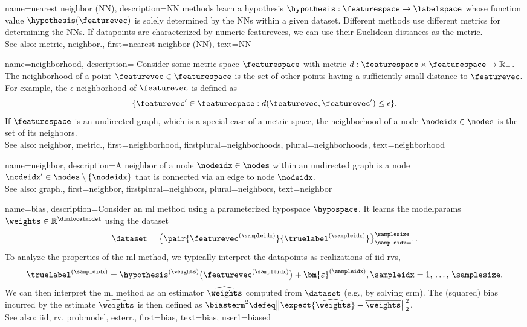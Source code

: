 {name={nearest neighbor (NN)},
	description={NN methods learn a \gls{hypothesis} 
		$\hypothesis: \featurespace \rightarrow \labelspace$ whose \gls{function} value $\hypothesis(\featurevec)$ 
		is solely determined by the NNs within a given \gls{dataset}. Different 
		methods use different \glspl{metric} for determining the NNs. If \glspl{datapoint} 
		are characterized by numeric \glspl{featurevec}, we can use their Euclidean distances as 
		the \gls{metric}.
					\\ 
		See also: \gls{metric}, \gls{neighbor}.},
	first={nearest neighbor (NN)},
	text={NN} 
}

 {name={neighborhood},
 	description={
 	Consider some \gls{metric} space $\featurespace$ with \gls{metric} 
	$d: \featurespace \times \featurespace \rightarrow \mathbb{R}_{+}$.	
 	The neighborhood of a point $\featurevec \in \featurespace$ 
 	is the set of other points having a sufficiently small distance to $\featurevec$. 
 	For example, the $\epsilon$-neighborhood of $\featurevec$ is defined as
 	$$ \{ \featurevec' \in \featurespace : d(\featurevec, \featurevec') \leq \epsilon \}.$$
	If $\featurespace$ is an undirected \gls{graph}, which is a special case of 
 	a \gls{metric} space, the neighborhood of a node $\nodeidx \in \nodes$ 
 	is the set of its \glspl{neighbor}.
 				\\ 
 	See also: \gls{neighbor}, \gls{metric}.},
 	first={neighborhood},
	firstplural={neighborhoods},
 	plural={neighborhoods},
 	text={neighborhood} 
 }


{name={neighbor},
	description={A neighbor of a node $\nodeidx \in \nodes$ 
		within an undirected \gls{graph} is a node $\nodeidx' \in \nodes \setminus \{ \nodeidx\}$ 
		that is connected via an edge to node $\nodeidx$.
				\\ 
		See also: \gls{graph}.},
	first={neighbor},
	firstplural={neighbors}, 
	plural={neighbors}, 
	text={neighbor} 
}

{name={bias},
	description={Consider an \gls{ml} method using a parameterized \gls{hypospace} $\hypospace$. 
		It learns the \glspl{modelparam} $\weights \in \mathbb{R}^{\dimlocalmodel}$ using the \gls{dataset} 
		$$\dataset=\big\{ \pair{\featurevec^{(\sampleidx)}}{\truelabel^{(\sampleidx)}} \big\}_{\sampleidx=1}^{\samplesize}.$$ 
		To analyze the properties of the \gls{ml} method, we typically interpret the \glspl{datapoint} as \glspl{realization} of \gls{iid} \glspl{rv}, 
		$$\truelabel^{(\sampleidx)} = \hypothesis^{(\overline{\weights})}\big( \featurevec^{(\sampleidx)} \big) + \bm{\varepsilon}^{(\sampleidx)}, \sampleidx=1, \,\ldots, \,\samplesize.$$ 
		We can then interpret the \gls{ml} method as an estimator $\widehat{\weights}$ 
		computed from $\dataset$ (e.g., by solving \gls{erm}). The (squared) bias incurred by 
		the estimate $\widehat{\weights}$ is then defined as $\biasterm^{2} \defeq \big\| \expect \{ \widehat{\weights}  \}- \overline{\weights}\big\|_{2}^{2}$.
					\\ 
		See also: \gls{iid}, \gls{rv}, \gls{probmodel}, \gls{esterr}.},
	first={bias},
	text={bias},
	user1={biased}
}

